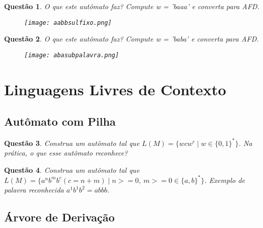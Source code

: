 \documentclass{article}
\newtheorem{problem}{Questão}
\begin{document}
    \begin{problem}
                O que este autômato faz? Compute w = 'baaa' e converta para AFD.
                  \begin{figure}[!htb]
                      \centering
                      \texttt{[image: aabbsulfixo.png]}
                  \end{figure}
    \end{problem}
    \begin{solution}
        
    \end{solution}
     \begin{problem}
         O que este autômato faz? Compute w = 'baba' e 
         converta para AFD.
                \begin{figure}[!htb]
                    \centering
                    \texttt{[image: abasubpalavra.png]}
                \end{figure}
    \end{problem}
\begin{solution}
        
    \end{solution}
\section{Linguagens Livres de Contexto}

    \subsection{Autômato com Pilha}
    
    \begin{problem}
         Construa um autômato tal que $L(M) = \{ wcw^r \mid w \in \{0,1\}^*\}$. Na prática, o que esse autômato reconhece?
    \end{problem}
    \begin{solution}
        
    \end{solution}
    \begin{problem}
         Construa um autômato tal que $L(M) = \{ a^n b^m b^c (c = n + m)\mid n>=0$, $m>=0 \in \{a,b\}^*\}$. Exemplo de palavra reconhecida $a^1 b^1 b^2 = abbb$.
    \end{problem}
    \begin{solution}
        
    \end{solution}
    \subsection{Árvore de Derivação}
    
\end{document}
